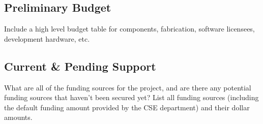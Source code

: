 \subsection{Preliminary Budget}
Include a high level budget table for components, fabrication, software licensees, development hardware, etc. 

\subsection{Current \& Pending Support}
What are all of the funding sources for the project, and are there any potential funding sources that haven't been secured yet? List all funding sources (including the default funding amount provided by the CSE department) and their dollar amounts.
